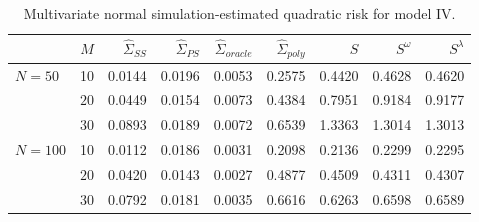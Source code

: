 \begin{table}[H]
\centering
\caption{Multivariate normal simulation-estimated quadratic risk  for model IV.} 
\begin{tabular}{lrrrrrrrr}
  & $M$ &$\hat{\Sigma}_{SS}$& $\hat{\Sigma}_{PS}$ &$\hat{\Sigma}_{oracle}$& $\hat{\Sigma}_{poly}$ & $S$ &$S^\omega$& $S^\lambda$ \\ 
  \hline
$N = 50$ & 10 & 0.0144 & 0.0196 & 0.0053 & 0.2575 & 0.4420 & 0.4628 & 0.4620 \\ 
  & $20$ & 0.0449 & 0.0154 & 0.0073 & 0.4384 & 0.7951 & 0.9184 & 0.9177 \\ 
  & $30$ & 0.0893 & 0.0189 & 0.0072 & 0.6539 & 1.3363 & 1.3014 & 1.3013 \\ 
 $N = 100$ & 10 & 0.0112 & 0.0186 & 0.0031 & 0.2098 & 0.2136 & 0.2299 & 0.2295 \\ 
    &    $20$ & 0.0420 & 0.0143 & 0.0027 & 0.4877 & 0.4509 & 0.4311 & 0.4307 \\ 
    &    $30$ & 0.0792 & 0.0181 & 0.0035 & 0.6616 & 0.6263 & 0.6598 & 0.6589 \\ 
   \hline
\end{tabular}
\label{table:simulation-1-quad-loss-sigma-4}
\end{table}

